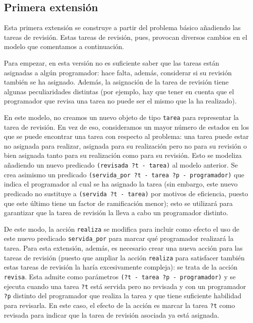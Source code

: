 
\subsection{Primera extensión} \label{sec:mod-ext1}

Esta primera extensión se construye a partir del problema básico añadiendo 
las tareas de revisión. Estas tareas de revisión, pues, provocan diversos 
cambios en el modelo que comentamos a continuación.

Para empezar, en esta versión no es suficiente saber que las tareas están 
asignadas a algún programador: hace falta, además, considerar si su revisión 
también se ha asignado. Además, la asignación de la tarea de revisión tiene 
algunas peculiaridades distintas (por ejemplo, hay que tener en cuenta que el 
programador que revisa una tarea no puede ser el mismo que la ha realizado).

En este modelo, no creamos un nuevo objeto de tipo \texttt{tarea} para 
representar la tarea de revisión. En vez de eso, consideramos un mayor número 
de estados en los que se puede encontrar una tarea con respecto al problema: 
una tarea puede estar no asignada para realizar, asignada para su realización 
pero no para su revisión o bien asignada tanto para su realización como para 
su revisión. Esto se modeliza añadiendo un nuevo predicado 
\texttt{(revisada ?t - tarea)} al modelo anterior. Se crea asimismo un 
predicado \texttt{(servida\_por ?t - tarea ?p - programador)} que indica el 
programador al cual se ha asignado la tarea (sin embargo, este nuevo predicado 
no sustituye a \texttt{(servida ?t - tarea)} por motivos de eficiencia, puesto 
que este último tiene un factor de ramificación menor); esto se utilizará para 
garantizar que la tarea de revisión la lleva a cabo un programador distinto.

De este modo, la acción \texttt{realiza} se modifica para incluir como efecto 
el uso de este nuevo predicado \texttt{servida\_por} para marcar qué 
programador realizará la tarea. Para esta extensión, además, es necesario 
crear una nueva acción para las tareas de revisión (puesto que ampliar la 
acción \texttt{realiza} para satisfacer también estas tareas de revisión la 
haría excesivamente compleja): se trata de la acción \texttt{revisa}. Esta 
admite como parámetros \texttt{(?t - tarea ?p - programador)} y se ejecuta 
cuando una tarea \texttt{?t} está servida pero no revisada y con un 
programador \texttt{?p} distinto del programador que realiza la tarea y que 
tiene suficiente habilidad para revisarla. En este caso, el efecto de la 
acción es marcar la tarea \texttt{?t} como revisada para indicar que la tarea 
de revisión asociada ya está asignada.



